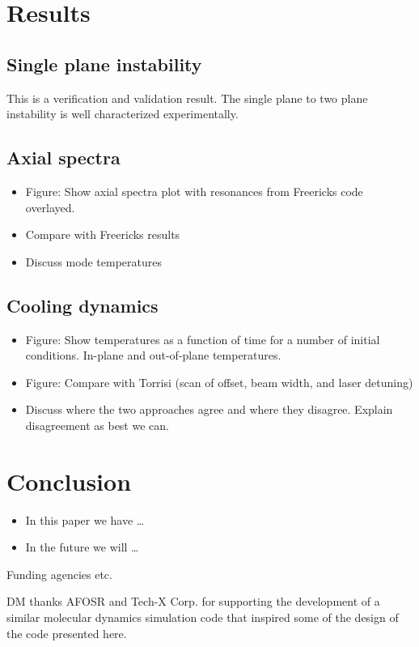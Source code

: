 \documentclass[aps, pra, preprint]{revtex4-1}
\begin{document}
\section{Results}


\subsection{Single plane instability}

This is a verification and validation result. The single plane to
two plane instability is well characterized experimentally.


\subsection{Axial spectra}

\begin{itemize}
    \item Figure: Show axial spectra plot with resonances from
        Freericks code overlayed.
    \item Compare with Freericks results
    \item Discuss mode temperatures
\end{itemize}


\subsection{Cooling dynamics}

\begin{itemize}
    \item Figure: Show temperatures as a function of time for a
        number of initial conditions. In-plane and
        out-of-plane temperatures.
    \item Figure: Compare with Torrisi (scan of offset, beam width, and
        laser detuning)
    \item
        Discuss where the two approaches agree and where they
        disagree. Explain disagreement as best we can.
\end{itemize}


\section{Conclusion}

\begin{itemize}
    \item In this paper we have \ldots
    \item In the future we will \ldots
\end{itemize}


\begin{acknowledgments}
    Funding agencies etc.

    DM thanks AFOSR and Tech-X Corp. for supporting the
    development of a similar molecular dynamics simulation code
    that inspired some of the design of the code presented here.
\end{acknowledgments}



\end{document}
